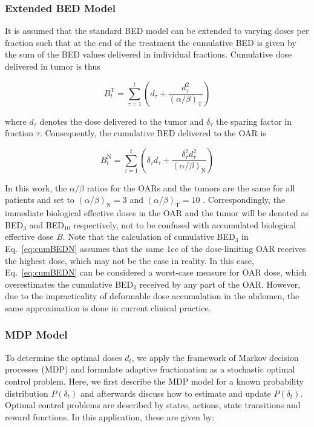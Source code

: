 \documentclass[\relativeRoot/ada.tex]{subfiles}
\begin{document}
\subsubsection{Extended BED Model}

It is assumed that the standard BED model can be extended to varying doses per fraction such that at the end of the treatment the cumulative BED is given by the sum of the BED values delivered in individual fractions. Cumulative dose delivered in tumor is thus

\begin{equation}\label{eq:cumBEDT}
    B^\text{T}_t = \sum_{\tau=1}^t(d_\tau+\frac{d_\tau^2}{({\alpha}/{\beta})_\text{T}})
\end{equation}

where $d_\tau$ denotes the dose delivered to the tumor and $\delta_\tau$ the sparing factor in fraction $\tau$. Consequently, the cumulative BED delivered to the OAR is

\begin{equation}\label{eq:cumBEDN}
B^\text{N}_t = \sum_{\tau=1}^t(\delta_\tau d_\tau+\frac{\delta_\tau^2 d_\tau^2}{({\alpha}/{\beta})_\text{N}})
\end{equation}

In this work, the ${\alpha}/{\beta}$ ratios for the OARs and the tumors are the same for all patients and set to $({\alpha}/{\beta})_\text{N} = 3$ and $({\alpha}/{\beta})_\text{T} = 10$ \cite{van_leeuwen_alfabeta}. Correspondingly, the immediate biological effective doses in the OAR and the tumor will be denoted as BED$_3$ and BED$_{10}$ respectively, not to be confused with accumulated biological effective dose $B$. Note that the calculation of cumulative BED$_3$ in Eq.~\eqref{eq:cumBEDN} assumes that the same 1cc of the dose-limiting OAR receives the highest dose, which may not be the case in reality. In this case, Eq.~\eqref{eq:cumBEDN} can be considered a worst-case measure for OAR dose, which overestimates the cumulative BED$_3$ received by any part of the OAR. However, due to the impracticality of deformable dose accumulation in the abdomen, the same approximation is done in current clinical practice.

\subsubsection{MDP Model}
To determine the  optimal doses $d_t$, we apply the framework of Markov decision processes (MDP) and formulate adaptive fractionation as a stochastic optimal control problem. Here, we first describe the MDP model for a known probability distribution $P(\delta_t)$ and afterwards discuss how to estimate and update $P(\delta_t)$. Optimal control problems are described by states, actions, state transitions and reward functions. In this application, these are given by:
\end{document}
